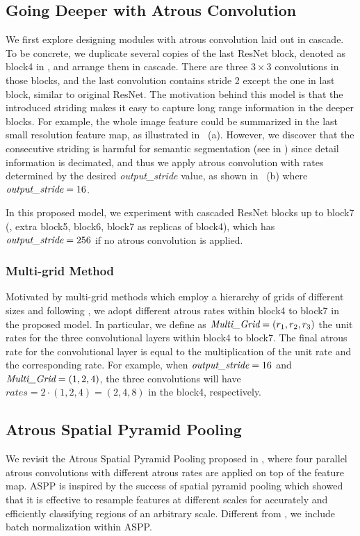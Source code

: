 \subsection{Going Deeper with Atrous Convolution}
We first explore designing modules with atrous convolution laid out in cascade. To be concrete, we duplicate several copies of the last ResNet block, denoted as block4 in , and arrange them in cascade. There are three $3\times3$ convolutions in those blocks, and the last convolution contains stride 2 except the one in last block, similar to original ResNet. The motivation behind this model is that the introduced striding makes it easy to capture long range information in the deeper blocks. For example, the whole image feature could be summarized in the last small resolution feature map, as illustrated in ~(a). However, we discover that the consecutive striding is harmful for semantic segmentation (see  in ) since detail information is decimated, and thus we apply atrous convolution with rates determined by the desired \emph{output\_stride} value, as shown in ~(b) where $\emph{output\_stride}=16$.

In this proposed model, we experiment with cascaded ResNet blocks up to block7 (\ie, extra block5, block6, block7 as replicas of block4), which has $\emph{output\_stride}=256$ if no atrous convolution is applied.

\subsubsection{Multi-grid Method}
Motivated by multi-grid methods which employ a hierarchy of grids of different sizes \cite{brandt1977multi, terzopoulos1986image, briggs2000multigrid, papandreou2007multigrid} and following \cite{wang2017understanding, dai2017deformable}, we adopt different atrous rates within block4 to block7 in the proposed model. In particular, we define as $\emph{Multi\_Grid}=(r_1,r_2,r_3)$ the unit rates for the three convolutional layers within block4 to block7. The final atrous rate for the convolutional layer is equal to the multiplication of the unit rate and the corresponding rate. For example, when $\emph{output\_stride}=16$ and $\emph{Multi\_Grid}=(1, 2, 4)$, the three convolutions will have $rates=2 \cdot (1, 2, 4) = (2, 4, 8)$ in the block4, respectively.

\subsection{Atrous Spatial Pyramid Pooling}
We revisit the Atrous Spatial Pyramid Pooling proposed in \cite{chen2016deeplab}, where four parallel atrous convolutions with different atrous rates are applied on top of the feature map. ASPP is inspired by the success of spatial pyramid pooling \cite{grauman2005pyramid, lazebnik2006beyond, he2014spatial} which showed that it is effective to resample features at different scales for accurately and efficiently classifying regions of an arbitrary scale. Different from \cite{chen2016deeplab}, we include batch normalization within ASPP. 

